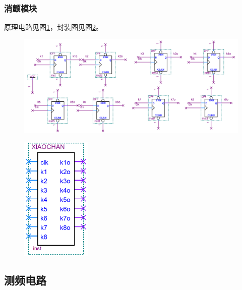 \documentclass[12pt]{article}
\begin{document}
\subsubsection{消颤模块}
原理电路见图\ref{fig:xiaochan}，封装图见图\ref{fig:fengzhuangxiaochanfz}。
\begin{figure}[hp]
	\centering  
	\includegraphics[width=\textwidth]{picture/xiaochan.png} 
	\caption{}
	\label{fig:xiaochan}   
\end{figure}
\begin{figure}[hp]
	\centering  
	\includegraphics[width=0.3\textwidth]{picture/xiaochanfz.png} 
	\caption{}
	\label{fig:fengzhuangxiaochanfz}   
\end{figure}
\subsection{测频电路}
\end{document}
